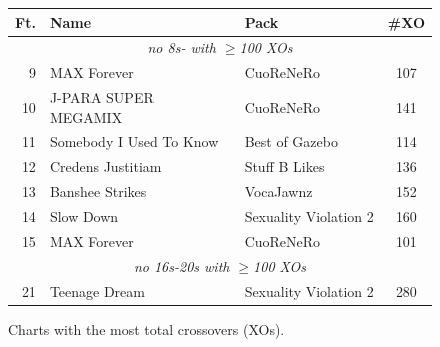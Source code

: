 \documentclass[10pt]{sigplanconf}
\begin{document}
\begin{figure}[t]
	\begin{center}
		\small
	\begin{tabular}{r|l|l|c}
		\bf Ft. & \bf Name & \bf Pack & \bf \#XO \\
		\hline
		\multicolumn{4}{c}{\em no 8s- with $\ge$100 XOs} \\
		 9 & MAX Forever              & CuoReNeRo & 107 \\
		10 & J-PARA SUPER MEGAMIX     & CuoReNeRo & 141 \\
		11 & Somebody I Used To Know    & Best of Gazebo    & 114 \\
		12 & Credens Justitiam        & Stuff B Likes         & 136 \\
		13 & Banshee Strikes          & VocaJawnz             & 152 \\
		14 & Slow Down                & Sexuality Violation 2 & 160 \\
		15 & MAX Forever              & CuoReNeRo & 101 \\
		\multicolumn{4}{c}{\em no 16s-20s with $\ge$100 XOs} \\
		21 & Teenage Dream            & Sexuality Violation 2 & 280 \\
	\end{tabular}
	\end{center}
	\caption{Charts with the most total crossovers (XOs).}
\end{figure}
\end{document}
